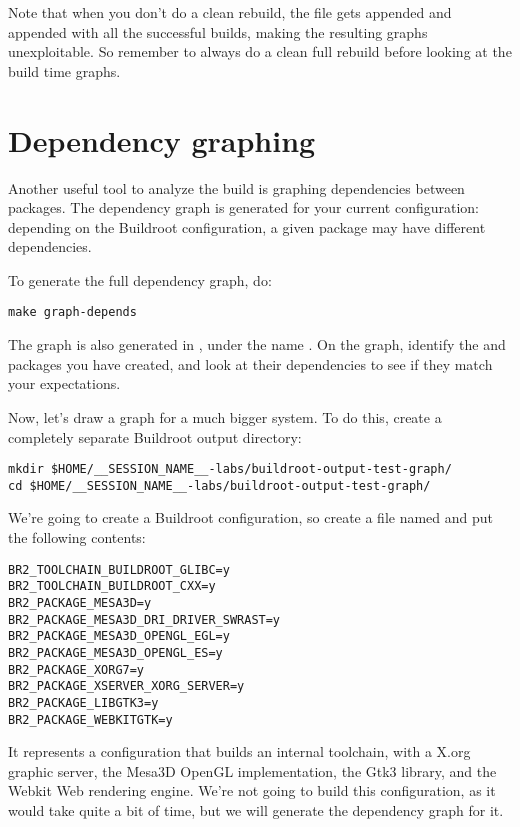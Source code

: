 Note that when you don't do a clean rebuild, the 
file gets appended and appended with all the successful builds, making
the resulting graphs unexploitable. So remember to always do a clean
full rebuild before looking at the build time graphs.

\section{Dependency graphing}

Another useful tool to analyze the build is graphing dependencies
between packages. The dependency graph is generated for your current
configuration: depending on the Buildroot configuration, a given
package may have different dependencies.

To generate the full dependency graph, do:

\begin{verbatim}
make graph-depends
\end{verbatim}

The graph is also generated in , under the name
. On the graph, identify the  and
 packages you have created, and look at their
dependencies to see if they match your expectations.

Now, let's draw a graph for a much bigger system. To do this, create a
completely separate Buildroot output directory:

\begin{verbatim}
mkdir $HOME/__SESSION_NAME__-labs/buildroot-output-test-graph/
cd $HOME/__SESSION_NAME__-labs/buildroot-output-test-graph/
\end{verbatim}

We're going to create a Buildroot configuration, so create a file
named  and put the following contents:

\begin{verbatim}
BR2_TOOLCHAIN_BUILDROOT_GLIBC=y
BR2_TOOLCHAIN_BUILDROOT_CXX=y
BR2_PACKAGE_MESA3D=y
BR2_PACKAGE_MESA3D_DRI_DRIVER_SWRAST=y
BR2_PACKAGE_MESA3D_OPENGL_EGL=y
BR2_PACKAGE_MESA3D_OPENGL_ES=y
BR2_PACKAGE_XORG7=y
BR2_PACKAGE_XSERVER_XORG_SERVER=y
BR2_PACKAGE_LIBGTK3=y
BR2_PACKAGE_WEBKITGTK=y
\end{verbatim}

It represents a configuration that builds an internal toolchain, with
a X.org graphic server, the Mesa3D OpenGL implementation, the Gtk3
library, and the Webkit Web rendering engine. We're not going to build
this configuration, as it would take quite a bit of time, but we will
generate the dependency graph for it.

